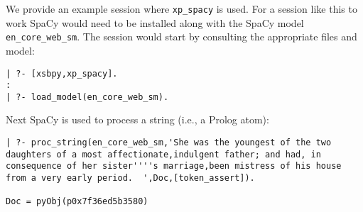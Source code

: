 \begin{example} \rm \label{spacy-examp}
We provide an example session where {\tt xp\_spacy} is used.  For a
session like this to work SpaCy would need to be installed along with
the SpaCy model {\tt en\_core\_web\_sm}.  The session would start by
consulting the appropriate files and model:
\begin{verbatim}
| ?- [xsbpy,xp_spacy].
:
| ?- load_model(en_core_web_sm).
\end{verbatim}
Next SpaCy is used to process a string (i.e., a Prolog atom):
\begin{verbatim}
| ?- proc_string(en_core_web_sm,'She was the youngest of the two daughters of a most affectionate,indulgent father; and had, in consequence of her sister''''s marriage,been mistress of his house from a very early period.  ',Doc,[token_assert]).

Doc = pyObj(p0x7f36ed5b3580)


\end{verbatim}
\end{example}
